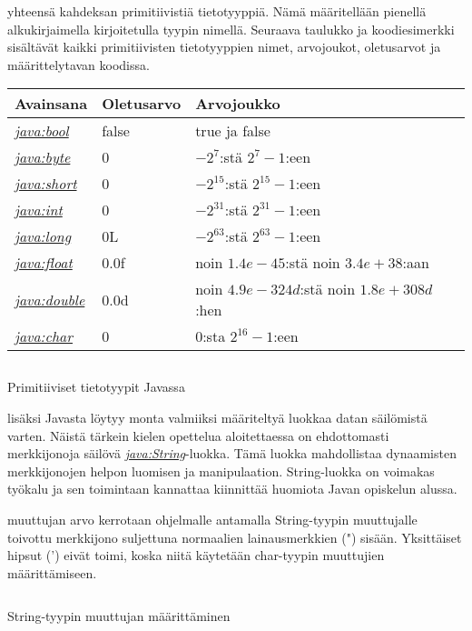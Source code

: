 \documentclass{tufte-book}
\newcommand{\java}[1]{\underline{\gls{java:#1}}}
\newcommand{\newjava}[1]{\textit{\java{#1}}}
\newcommand{\code}[3]{
\begin{listing}
    \inputminted{java}{OhjelmointiopasEsimerkit/src/#1/#2.java}
    \caption{#3}
    \label{Java-#1-#2}
\end{listing}
}
\begin{document}
 yhteensä kahdeksan primitiivistiä tietotyyppiä. Nämä määritellään
pienellä alkukirjaimella kirjoitetulla tyypin nimellä. Seuraava taulukko ja koodiesimerkki
sisältävät kaikki primitiivisten tietotyyppien nimet, arvojoukot, oletusarvot ja määrittelytavan
koodissa.

\bigskip
\begin{center}
\footnotesize
\begin{tabular}{lll}
\toprule
Avainsana & Oletusarvo & Arvojoukko \\
\midrule
\newjava{bool} & false & true ja false \\
\addlinespace
\newjava{byte} & 0 & $-2^7$:stä $2^7-1$:een \\
\addlinespace
\newjava{short} & 0 & $-2^{15}$:stä $2^{15}-1$:een \\
\addlinespace
\newjava{int} & 0 & $-2^{31}$:stä $2^{31}-1$:een \\
\addlinespace
\newjava{long} & 0L & $-2^{63}$:stä $2^{63}-1$:een \\
\addlinespace
\newjava{float} & 0.0f & noin $1.4e-45$:stä noin $3.4e+38$:aan \\
\addlinespace
\newjava{double} & 0.0d & noin $4.9e-324d$:stä noin $1.8e+308d$:hen \\
\addlinespace
\newjava{char} & 0 & $0$:sta $2^{16}-1$:een \\
\bottomrule
\end{tabular}
\end{center}

\code{week2}{BasicDataTypes}{Primitiiviset tietotyypit Javassa}

 lisäksi Javasta löytyy monta valmiiksi määriteltyä luokkaa datan
säilömistä varten. Näistä tärkein kielen opettelua aloitettaessa on ehdottomasti merkkijonoja
säilövä \newjava{String}-luokka. Tämä luokka mahdollistaa dynaamisten merkkijonojen helpon
luomisen ja manipulaation. String-luokka on voimakas työkalu ja sen toimintaan kannattaa
kiinnittää huomiota Javan opiskelun alussa.

 muuttujan arvo kerrotaan ohjelmalle antamalla String-tyypin
muuttujalle toivottu merkkijono suljettuna normaalien lainausmerkkien (") sisään. Yksittäiset 
hipsut (') eivät toimi, koska niitä käytetään char-tyypin muuttujien määrittämiseen.

\code{week2}{BasicString}{String-tyypin muuttujan määrittäminen}

\end{document}
